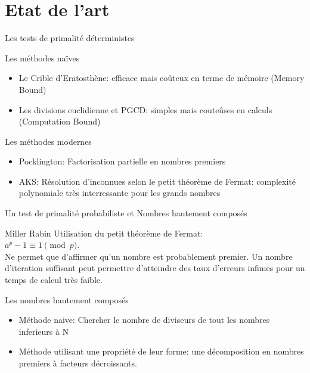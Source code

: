	\section{Etat de l'art}
\begin{frame}{Les tests de primalit\'e d\'eterministes}
\begin{block}{Les m\'ethodes na\"ives}
 \begin{itemize}
 \item {
   Le Crible d'Eratosth\`ene: efficace mais co\^uteux en terme de m\'emoire (Memory Bound)
 }
 \item {  
   Les divisions euclidienne et PGCD: simples mais coute\^uses en calculs (Computation Bound)
 }
 \end{itemize}
\end{block} \pause

\begin{block}{Les m\'ethodes modernes}
 \begin{itemize}
 \item {
   Pocklington: Factorisation partielle en nombres premiers
 }
 \item {
   AKS: R\'esolution d'inconnues selon le petit th\'eor\`eme de Fermat: complexit\'e polynomiale tr\`es interressante pour les grands nombres
 }
 \end{itemize}
\end{block}
\end{frame}

\begin{frame}{Un test de primalit\'e probabiliste et Nombres hautement compos\'es}
\begin{block}{Miller Rabin}
 Utilisation du petit th\'eor\`eme de Fermat: \\ $a^p-1 \equiv 1 \pmod p$.\\
 Ne permet que d'affirmer qu'un nombre est probablement premier. Un nombre d'iteration suffisant peut permettre d'atteindre des taux d'erreurs infimes pour un temps de calcul tr\`es faible.
\end{block} \pause

\begin{block}{Les nombres hautement compos\'es}
 \begin{itemize}
 \item {
   M\'ethode naive: Chercher le nombre de diviseurs de tout les nombres inferieurs à N
 }
 \item {
   M\'ethode utilisant une propri\'et\'e de leur forme: une d\'ecomposition en nombres premiers à facteurs d\'ecroissants.
 }
 \end{itemize}
\end{block}
\end{frame}

